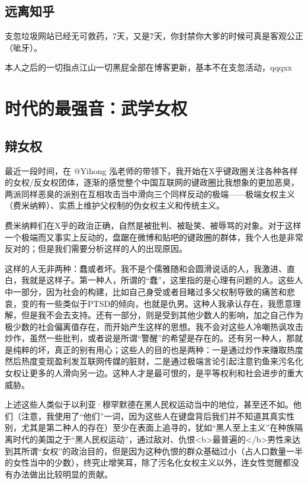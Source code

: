 \documentclass{ctexart}
\begin{document}
	\subsection{远离知乎}
	
	支忽垃圾网站已经无可救药，7天，又是7天，你封禁你大爹的时候可真是客观公正（呲牙）。
	
	本人之后的一切指点江山一切黑屁全部在博客更新，基本不在支忽活动，qqqxx
	
	
	\section{时代的最强音：武学女权}
	
	\subsection{辩女权}
	
	最近一段时间，在 @Yihong 泓老师的带领下，我开始在X乎键政圈关注各种各样的女权/反女权团体，逐渐的感觉整个中国互联网的键政圈比我想象的更加恶臭，两派同样恶臭的派别在互相攻击当中滑向三个同样反动的极端——极端女权主义（费米纳粹）、实质上维护父权制的伪女权主义和传统主义。
	
	费米纳粹们在X乎的政治正确，自然是被批判、被耻笑、被辱骂的对象。对于这样一个极端而又事实上反动的，盘踞在微博和贴吧的键政圈的群体，我个人也是非常反对的；但是我们需要分析这样的人的出现原因。
	
	这样的人无非两种：蠢或者坏。我不是个儒雅随和会圆滑说话的人，我激进、直白，我就是这样子。第一种人，所谓的“蠢”，这里指的是心理有问题的人。这些人中一部分，因为社会的构建，比如自己身受或者目睹过多父权制导致的痛苦和悲哀，变的有一些类似于PTSD的倾向，也就是仇男。这种人我承认存在，我愿意理解，但是我不会去支持。还有一部分，则是受到其他少数人的影响，加之自己作为极少数的社会偏离值存在，而开始产生这样的思想。我不会对这些人冷嘲热讽攻击炒作，虽然一些批判，或者说是所谓“警醒”的希望是存在的。还有另一种人，那就是纯粹的坏，真正的别有用心；这些人的目的也是两种：一是通过炒作来赚取热度然后热度变现盈利发互联网传媒的脏财，二是通过极端言论引起注意钓鱼来污名化女权让更多的人滑向另一边。这种人才是最可恨的，是平等权利和社会进步的重大威胁。
	
	上述这些人类似于以利亚·穆罕默德在黑人民权运动当中的地位，甚至还不如。他们（注意，我使用了“他们”一词，因为这些人在键盘背后我们并不知道其真实性别，尤其是第二种人的存在）至少在表面上追寻的，犹如“黑人至上主义”在种族隔离时代的美国之于“黑人民权运动”，通过敌对、仇恨<b>最普遍的</b>男性来达到其所谓“女权”的政治目的，但是因为这种仇恨的群众基础过小（占人口数量一半的女性当中的少数），终究止增笑耳，除了污名化女权主义以外，连女性觉醒都没有办法做出比较明显的贡献。
	
\end{document}
